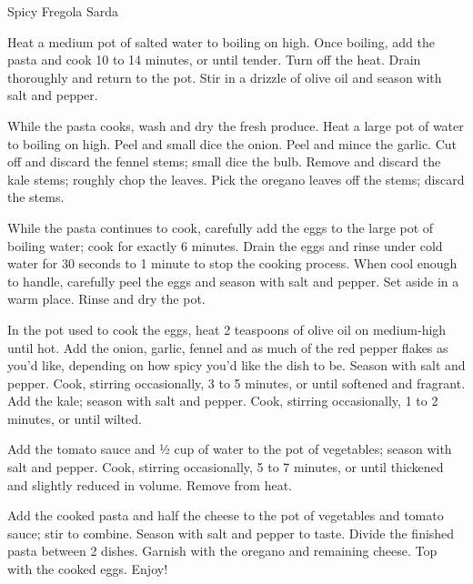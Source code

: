 \begin{recipe}{Spicy Fregola Sarda}

    \begin{ingredients}
    \end{ingredients}

    \begin{instructions}
        Heat a medium pot of salted water to boiling on high. Once boiling, add the pasta and cook 10 to 14 minutes, or until tender. Turn off the heat. Drain thoroughly and return to the pot. Stir in a drizzle of olive oil and season with salt and pepper.

        While the pasta cooks, wash and dry the fresh produce. Heat a large pot of water to boiling on high. Peel and small dice the onion. Peel and mince the garlic. Cut off and discard the fennel stems; small dice the bulb. Remove and discard the kale stems; roughly chop the leaves. Pick the oregano leaves off the stems; discard the stems.

        While the pasta continues to cook, carefully add the eggs to the large pot of boiling water; cook for exactly 6 minutes. Drain the eggs and rinse under cold water for 30 seconds to 1 minute to stop the cooking process. When cool enough to handle, carefully peel the eggs and season with salt and pepper. Set aside in a warm place. Rinse and dry the pot.

        In the pot used to cook the eggs, heat 2 teaspoons of olive oil on medium-high until hot. Add the onion, garlic, fennel and as much of the red pepper flakes as you’d like, depending on how spicy you’d like the dish to be. Season with salt and pepper. Cook, stirring occasionally, 3 to 5 minutes, or until softened and fragrant. Add the kale; season with salt and pepper. Cook, stirring occasionally, 1 to 2 minutes, or until wilted.

        Add the tomato sauce and ½ cup of water to the pot of vegetables; season with salt and pepper. Cook, stirring occasionally, 5 to 7 minutes, or until thickened and slightly reduced in volume. Remove from heat.

        Add the cooked pasta and half the cheese to the pot of vegetables and tomato sauce; stir to combine. Season with salt and pepper to taste. Divide the finished pasta between 2 dishes. Garnish with the oregano and remaining cheese. Top with the cooked eggs. Enjoy!
    \end{instructions}
\end{recipe}
